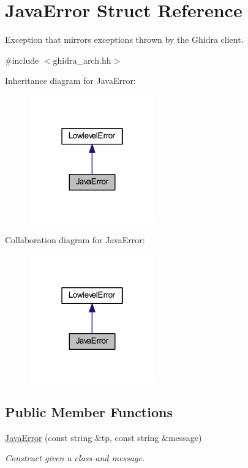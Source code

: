 \hypertarget{struct_java_error}{}\section{Java\+Error Struct Reference}
\label{struct_java_error}


Exception that mirrors exceptions thrown by the Ghidra client.  




{\ttfamily \#include $<$ghidra\+\_\+arch.\+hh$>$}



Inheritance diagram for Java\+Error\+:
\nopagebreak
\begin{figure}[H]
\begin{center}
\leavevmode
\includegraphics[width=154pt]{struct_java_error__inherit__graph}
\end{center}
\end{figure}


Collaboration diagram for Java\+Error\+:
\nopagebreak
\begin{figure}[H]
\begin{center}
\leavevmode
\includegraphics[width=154pt]{struct_java_error__coll__graph}
\end{center}
\end{figure}
\subsection*{Public Member Functions}
\begin{DoxyCompactItemize}
\item 
\mbox{\hyperlink{struct_java_error_a91a61d19d9f4638ff503968f7f458dec}{Java\+Error}} (const string \&tp, const string \&message)
\begin{DoxyCompactList}\small\item\em Construct given a class and message. \end{DoxyCompactList}\end{DoxyCompactItemize}
